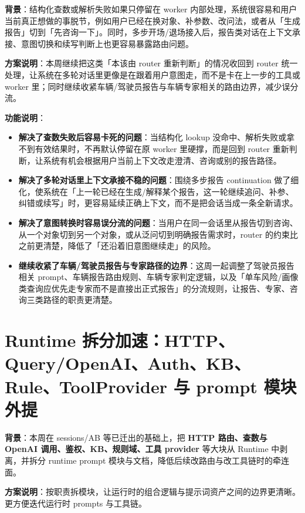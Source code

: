 \documentclass[UTF8]{ctexart}
\begin{document}
\textbf{背景}：结构化查数或解析失败如果只停留在 worker 内部处理，系统很容易和用户当前真正想做的事脱节，例如用户已经在换对象、补参数、改问法，或者从「生成报告」切到「先咨询一下」。同时，多步开场/退场接入后，报告类对话在上下文承接、意图切换和续写判断上也更容易暴露路由问题。

\textbf{方案说明}：本周继续把这类「本该由 router 重新判断」的情况收回到 router 统一处理，让系统在多轮对话里更像是在跟着用户意图走，而不是卡在上一步的工具或 worker 里；同时继续收紧车辆/驾驶员报告与车辆专家相关的路由边界，减少误分流。

\textbf{功能说明}：
\begin{itemize}
\item \textbf{解决了查数失败后容易卡死的问题}：当结构化 lookup 没命中、解析失败或拿不到有效结果时，不再默认停留在原 worker 里硬撑，而是回到 router 重新判断，让系统有机会根据用户当前上下文改走澄清、咨询或别的报告路径。
\item \textbf{解决了多轮对话里上下文承接不稳的问题}：围绕多步报告 continuation 做了细化，使系统在「上一轮已经在生成/解释某个报告，这一轮继续追问、补参、纠错或续写」时，更容易延续正确上下文，而不是把会话当成一条全新请求。
\item \textbf{解决了意图转换时容易误分流的问题}：当用户在同一会话里从报告切到咨询、从一个对象切到另一个对象，或从泛问切到明确报告需求时，router 的约束比之前更清楚，降低了「还沿着旧意图继续走」的风险。
\item \textbf{继续收紧了车辆/驾驶员报告与专家路径的边界}：这周一起调整了驾驶员报告相关 prompt、车辆报告路由规则、车辆专家判定逻辑，以及「单车风险/画像类查询应优先走专家而不是直接出正式报告」的分流规则，让报告、专家、咨询三类路径的职责更清楚。
\end{itemize}

\section{Runtime 拆分加速：HTTP、Query/OpenAI、Auth、KB、Rule、ToolProvider 与 prompt 模块外提}

\textbf{背景}：本周在 sessions/AB 等已迁出的基础上，把 \textbf{HTTP 路由、查数与 OpenAI 调用、鉴权、KB、规则域、工具 provider} 等大块从 Runtime 中剥离，并拆分 runtime prompt 模块与文档，降低后续改路由与改工具链时的牵连面。

\textbf{方案说明}：按职责拆模块，让运行时的组合逻辑与提示词资产之间的边界更清晰。更方便迭代运行时 prompts 与工具链。
\end{document}
